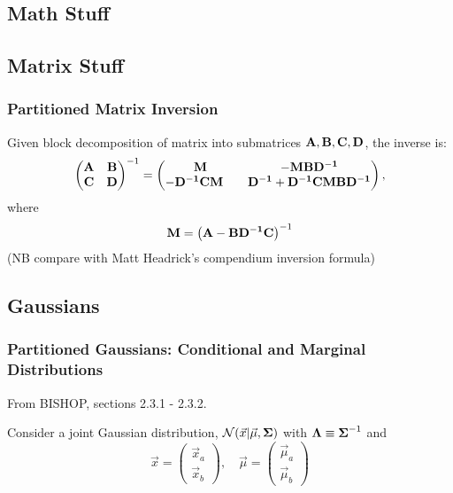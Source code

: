 \documentclass[11pt]{article}
\begin{document}
\newpage
\begin{appendices}
  \section{Math Stuff}

  \subsection{Matrix Stuff}
  \subsubsection{Partitioned Matrix Inversion}
  Given block decomposition of matrix into submatrices
  $\mathbf{A}, \mathbf{B}, \mathbf{C}, \mathbf{D}$, the inverse is:
  \begin{equation}
    \left(
      \begin{matrix}
        \mathbf{A} & \mathbf{B}\\
        \mathbf{C} & \mathbf{D}
      \end{matrix}
    \right)^{-1}
    =
    \left(
      \begin{matrix}
        \mathbf{M} & \mathbf{-M B D^{-1}}\\
        \mathbf{-D^{-1} C M}\quad & \mathbf{D^{-1}+D^{-1} C M B D^{-1}}
      \end{matrix}
    \right),
  \end{equation}
  where
  \begin{equation}
    \mathbf{M} = \left(\mathbf{A} - \mathbf{B D^{-1} C} \right)^{-1}
  \end{equation}
  (NB compare with Matt Headrick's compendium inversion formula)


\subsection{Gaussians}
\subsubsection{Partitioned Gaussians: Conditional and Marginal Distributions}
From BISHOP, sections 2.3.1 - 2.3.2.

Consider a joint Gaussian distribution, $\mathcal{N}(\vec{x} | \vec{\mu}, \boldsymbol{\Sigma})$ with
$\boldsymbol{\Lambda} \equiv \boldsymbol{\Sigma}^{-1}$ and
\begin{equation}
  \vec{x} =
  \left(
    \begin{matrix}
      \vec{x}_a \\
      \vec{x}_b
    \end{matrix}
  \right)
  , \quad
  \vec{\mu} =
  \left(
    \begin{matrix}
      \vec{\mu}_a \\
      \vec{\mu}_b
    \end{matrix}
  \right)
\end{equation}


\end{appendices}
\end{document}
